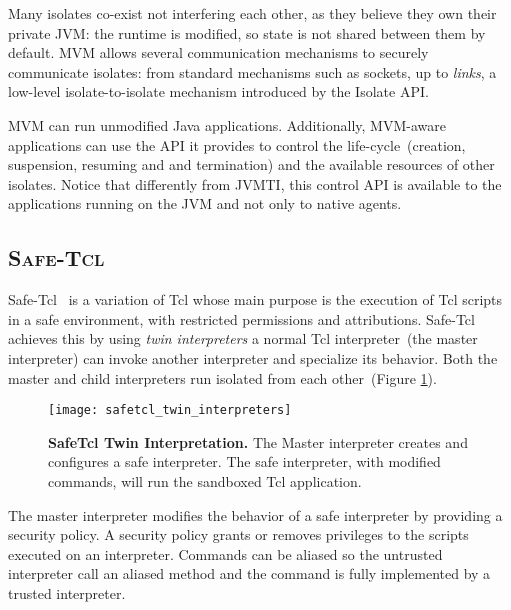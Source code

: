 Many isolates co-exist not interfering each other, as they believe they own their private JVM: the runtime is modified, so state is not shared between them by default. MVM allows several communication mechanisms to securely communicate isolates: from standard mechanisms such as sockets, up to \emph{links}, a low-level isolate-to-isolate mechanism introduced by the Isolate API.

MVM can run unmodified Java applications. Additionally, MVM-aware applications can use the API it provides to control the life-cycle~(\eg creation, suspension, resuming and and termination) and the available resources of other isolates. Notice that differently from JVMTI, this control API is available to the applications running on the JVM and not only to native agents.

\subsection*{\textsc{Safe-Tcl}}
Safe-Tcl~\cite{Levy97a, Bore94a} is a variation of Tcl whose main purpose is the execution of Tcl scripts in a safe environment, with restricted permissions and attributions. Safe-Tcl achieves this by using \emph{twin interpreters} \ie a normal Tcl interpreter~(the master interpreter) can invoke another interpreter and specialize its behavior. Both the master and child interpreters run isolated from each other~(Figure \ref{fig:safetcl_twin_interpreters}).

\begin{figure}[ht]
\begin{center}
\texttt{[image: safetcl\_twin\_interpreters]}
\caption{\textbf{SafeTcl Twin Interpretation.} The Master interpreter creates and configures a safe interpreter. The safe interpreter, with modified commands, will run the sandboxed Tcl application.\label{fig:safetcl_twin_interpreters}
 }
\end{center}
\end{figure}

The master interpreter modifies the behavior of a safe interpreter by providing a security policy. A security policy grants or removes privileges to the scripts executed on an interpreter. Commands can be aliased so the untrusted interpreter call an aliased method and the command is fully implemented by a trusted interpreter.

